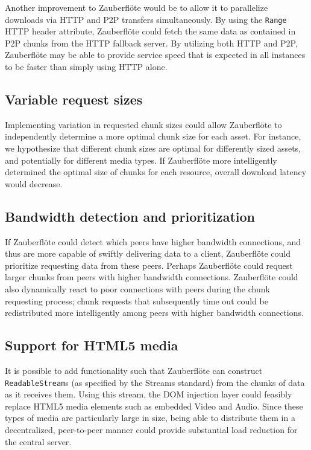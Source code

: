\documentclass[letterpaper,twocolumn,10pt]{article}
\newcommand{\zbf}{Zauberfl\"{o}te\xspace}
\begin{document}
Another improvement to \zbf would be to allow it to parallelize downloads via HTTP and P2P transfers simultaneously. By using the \texttt{Range} HTTP header attribute, \zbf could fetch the same data as contained in P2P chunks from the HTTP fallback server. By utilizing both HTTP and P2P, \zbf may be able to provide service speed that is expected in all instances to be faster than simply using HTTP alone.

\subsection{Variable request sizes}

Implementing variation in requested chunk sizes could allow \zbf to independently
determine a more optimal chunk size for each asset. For instance, we hypothesize
that different chunk sizes are optimal for differently sized assets, and potentially
for different media types. If \zbf more intelligently determined the optimal size
of chunks for each resource, overall download latency would decrease.

\subsection{Bandwidth detection and prioritization}

If \zbf could detect which peers have higher bandwidth connections, and thus
are more capable of swiftly delivering data to a client, \zbf could prioritize
requesting data from these peers. Perhaps \zbf could request larger chunks from
peers with higher bandwidth connections. \zbf could also dynamically react to
poor connections with peers during the chunk requesting process; chunk requests
that subsequently time out could be redistributed more intelligently among
peers with higher bandwidth connections.

\subsection{Support for HTML5 media}
It is possible to add functionality such that \zbf can construct
\texttt{ReadableStream}s (as specified by the Streams standard)
from the chunks of data as it receives them. Using this stream, the DOM injection
layer could feasibly replace HTML5 media elements such as embedded Video and Audio.
Since these types of media are particularly large in size, being able to distribute
them in a decentralized, peer-to-peer manner could provide substantial load
reduction for the central server.
\end{document}

